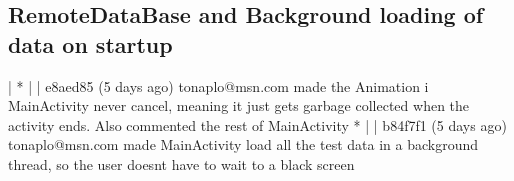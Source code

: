 \subsection{RemoteDataBase and Background loading of data on startup}\label{sec:sprint4:dev:remotedbandbgloading}
| * | | e8aed85 (5 days ago) tonaplo@msn.com made the Animation i MainActivity never cancel, meaning it just gets garbage collected when the activity ends. Also commented the rest of MainActivity
* | | b84f7f1 (5 days ago) tonaplo@msn.com made MainActivity load all the test data in a background thread, so the user doesnt have to wait to a black screen